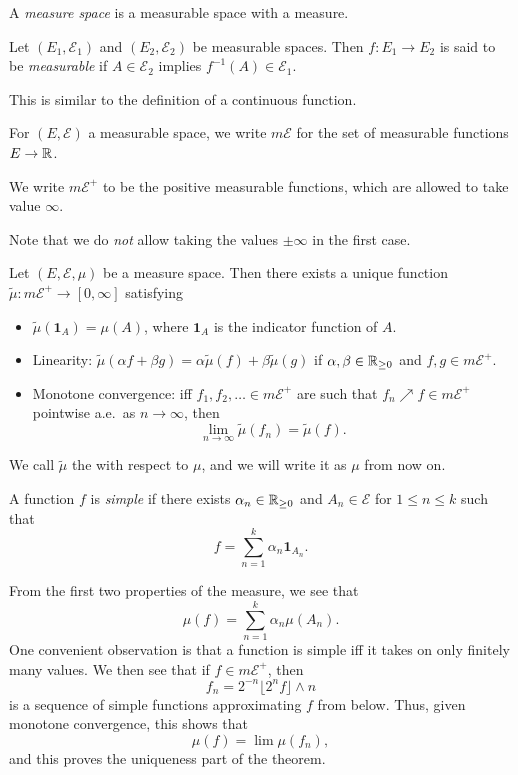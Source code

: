 \documentclass[a4paper]{article}
\begin{document}
\begin{defi}
  A \emph{measure space} is a measurable space with a measure.
\end{defi}

\begin{defi}
  Let $(E_1, \mathcal{E}_1)$ and $(E_2, \mathcal{E}_2)$ be measurable spaces. Then $f: E_1 \to E_2$ is said to be \emph{measurable} if $A \in \mathcal{E}_2$ implies $f^{-1}(A) \in \mathcal{E}_1$.
\end{defi}
This is similar to the definition of a continuous function.

\begin{notation}
  For $(E, \mathcal{E})$ a measurable space, we write $m\mathcal{E}$ for the set of measurable functions $E \to \mathbb{R}$.

  We write $m\mathcal{E}^+$ to be the positive measurable functions, which are allowed to take value $\infty$.
\end{notation}
Note that we do \emph{not} allow taking the values $\pm \infty$ in the first case.

\begin{thm}
  Let $(E, \mathcal{E}, \mu)$ be a measure space. Then there exists a unique function $\tilde{\mu}: m\mathcal{E}^+ \to [0, \infty]$ satisfying
  \begin{itemize}
    \item $\tilde{\mu}(\mathbf{1}_A) = \mu(A)$, where $\mathbf{1}_A$ is the indicator function of $A$.
    \item Linearity: $\tilde{\mu}(\alpha f + \beta g) = \alpha \tilde{\mu}(f) + \beta \tilde{\mu}(g)$ if $\alpha, \beta \in \mathbb{R}_{\geq 0}$ and $f, g \in m\mathcal{E}^+$.
    \item Monotone convergence: iff $f_1, f_2, \ldots \in m\mathcal{E}^+$ are such that $f_n \nearrow f \in m\mathcal{E}^+$ pointwise a.e.\ as $n \to \infty$, then
      \[
        \lim_{n \to \infty} \tilde{\mu}(f_n) = \tilde{\mu} (f).
      \]
  \end{itemize}
  We call $\tilde{\mu}$ the  with respect to $\mu$, and we will write it as $\mu$ from now on.
\end{thm}

\begin{defi}
  A function $f$ is \emph{simple} if there exists $\alpha_n \in \mathbb{R}_{\geq 0}$ and $A_n \in \mathcal{E}$ for $1 \leq n \leq k$ such that
  \[
    f = \sum_{n = 1}^k \alpha_n \mathbf{1}_{A_n}.
  \]
\end{defi}
From the first two properties of the measure, we see that
\[
  \mu(f) = \sum_{n = 1}^k \alpha_n \mu(A_n).
\]
One convenient observation is that a function is simple iff it takes on only finitely many values. We then see that if $f \in m \mathcal{E}^+$, then
\[
  f_n = 2^{-n}\lfloor 2^n f\rfloor \wedge n
\]
is a sequence of simple functions approximating $f$ from below. Thus, given monotone convergence, this shows that
\[
  \mu(f) = \lim \mu(f_n),
\]
and this proves the uniqueness part of the theorem.
\end{document}
